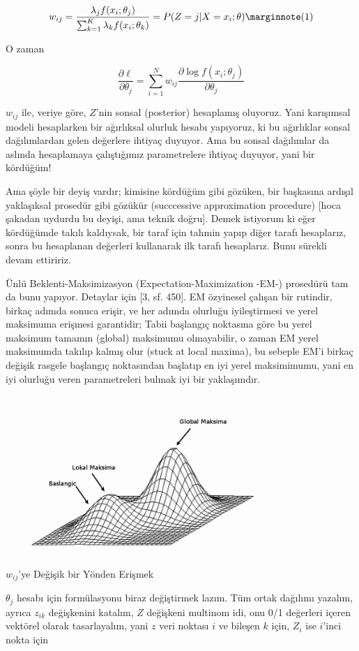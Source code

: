 \documentclass[12pt,fleqn]{article}\usepackage{../../common}
\begin{document}
$$  
 w_{ij} 
= \frac{\lambda_j f(x_i;\theta_j)}{\sum_{k=1}^{K} \lambda_k f(x_i;\theta_k)} 
= P(Z=j | X=x_i;\theta)
\mlabel{1}
$$

O zaman 

$$ \frac{\partial \ell}{\partial \theta_j}  = \sum_{i=1}^{N}
w_{ij} \frac{\partial \log f(x_i;\theta_j)}{\partial \theta_j}
$$

$w_{ij}$ ile, veriye göre, $Z$'nin sonsal (posterior) hesaplamış oluyoruz. Yani
karışımsal modeli hesaplarken bir ağırlıksal olurluk hesabı yapıyoruz, ki bu
ağırlıklar sonsal dağılımlardan gelen değerlere ihtiyaç duyuyor. Ama bu sonsal
dağılımlar da aslında hesaplamaya çalıştığımız parametrelere ihtiyaç duyuyor,
yani bir kördüğüm!

Ama şöyle bir deyiş vardır; kimisine kördüğüm gibi gözüken, bir başkasına
ardışıl yaklaşıksal prosedür gibi gözükür (succcessive approximation procedure)
[hoca şakadan uydurdu bu deyişi, ama teknik doğru]. Demek istiyorum ki eğer
kördüğümde takılı kaldıysak, bir taraf için tahmin yapıp diğer tarafı
hesaplarız, sonra bu hesaplanan değerleri kullanarak ilk tarafı hesaplarız. Bunu
sürekli devam ettiririz.

Ünlü Beklenti-Maksimizasyon (Expectation-Maximization -EM-) prosedürü tam da
bunu yapıyor. Detaylar için [3, sf. 450]. EM özyinesel çalışan bir rutindir,
birkaç adımda sonuca erişir, ve her adımda olurluğu iyileştirmesi ve yerel
maksimuma erişmesi garantidir; Tabii başlangıç noktasına göre bu yerel maksimum
tamamın (global) maksimumu olmayabilir, o zaman EM yerel maksimumda takılıp
kalmış olur (stuck at local maxima), bu sebeple EM'i birkaç değişik rasgele
başlangıç noktasından başlatıp en iyi yerel maksimimumu, yani en iyi olurluğu
veren parametreleri bulmak iyi bir yaklaşımdır.

\includegraphics[height=6cm]{localmax.png}

$w_{ij}$'ye Değişik bir Yönden Erişmek

$\theta_j$ hesabı için formülasyonu biraz değiştirmek lazım. Tüm ortak dağılımı
yazalım, ayrıca $z_{ik}$ değişkenini katalım, $Z$ değişkeni multinom idi, onu
0/1 değerleri içeren vektörel olarak tasarlayalım, yani $z$ veri noktası $i$ ve
bileşen $k$ için, $Z_i$ ise $i$'inci nokta için
\end{document}
